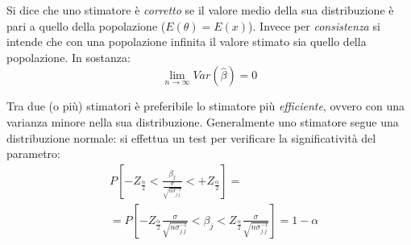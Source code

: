 \documentclass[11pt, twocolumn]{article}
\begin{document}
Si dice che uno stimatore è \textit{corretto} se il valore medio della sua distribuzione è pari a quello della popolazione ($E(\theta) = E(x)$).
Invece per \textit{consistenza} si intende che con una popolazione infinita il valore stimato sia quello della popolazione.
In sostanza:
$$\lim_{n\to\infty} Var(\hat{\beta}) = 0$$

Tra due (o più) stimatori è preferibile lo stimatore più \textit{efficiente}, ovvero con una varianza minore nella sua distribuzione.
Generalmente uno stimatore segue una distribuzione normale: si effettua un test per verificare la significatività del parametro:
\begin{align*}
  &P[-Z_{\frac{\alpha}{2}} < \frac{\beta_j}{\frac{\sigma}{\sqrt{n\sigma^{-1}_{j.j}}}} < +Z_{\frac{\alpha}{2}}] = \\
  &= P[-Z_{\frac{\alpha}{2}} \frac{\sigma}{\sqrt{n\sigma^{-1}_{j.j}}} < \beta_j < Z_{\frac{\alpha}{2}} \frac{\sigma}{\sqrt{n\sigma^{-1}_{j.j}}}] = 1 - \alpha
\end{align*}
\end{document}
